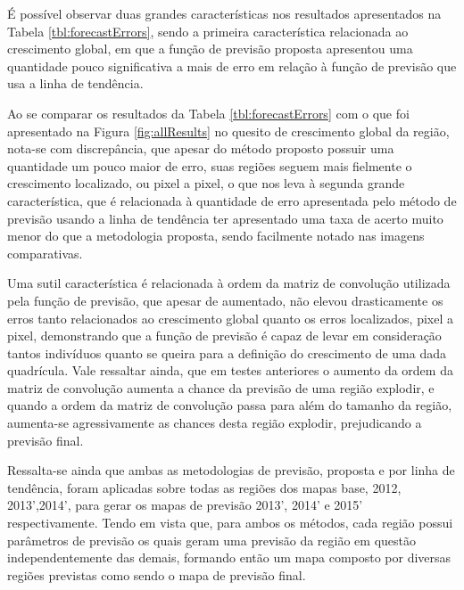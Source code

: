É possível observar duas grandes características nos resultados apresentados na Tabela \ref{tbl:forecastErrors}, sendo a primeira característica relacionada ao crescimento global, em que a função de previsão proposta apresentou uma quantidade pouco significativa a mais de erro em relação à função de previsão que usa a linha de tendência. 

Ao se comparar os resultados da Tabela \ref{tbl:forecastErrors} com o que foi apresentado na Figura \ref{fig:allResults} no quesito de crescimento global da região, nota-se com discrepância, que apesar do método proposto possuir uma quantidade um pouco maior de erro, suas regiões seguem mais fielmente o crescimento localizado, ou pixel a pixel, o que nos leva à segunda grande característica, que é relacionada à quantidade de erro apresentada pelo método de previsão usando a linha de tendência ter apresentado uma taxa de acerto muito menor do que a metodologia proposta, sendo facilmente notado nas imagens comparativas.

Uma sutil característica é relacionada à ordem da matriz de convolução utilizada pela função de previsão, que apesar de aumentado, não elevou drasticamente os erros tanto relacionados ao crescimento global quanto os erros localizados, pixel a pixel, demonstrando que a função de previsão é capaz de levar em consideração tantos indivíduos quanto se queira para a definição do crescimento de uma dada quadrícula. Vale ressaltar ainda, que em testes anteriores o aumento da ordem da matriz de convolução aumenta a chance da previsão de uma região explodir, e quando a ordem da matriz de convolução passa para além do tamanho da região, aumenta-se agressivamente as chances desta região explodir, prejudicando a previsão final.

Ressalta-se ainda que ambas as metodologias de previsão, proposta e por linha de tendência, foram aplicadas sobre todas as regiões dos mapas base, 2012, 2013',2014', para gerar os mapas de previsão 2013', 2014' e 2015' respectivamente. Tendo em vista que, para ambos os métodos, cada região possui parâmetros de previsão os quais geram uma previsão da região em questão independentemente das demais, formando então um mapa composto por diversas regiões previstas como sendo o mapa de previsão final. 

